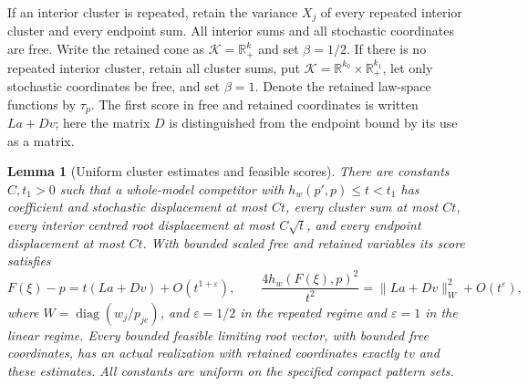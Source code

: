 \documentclass[11pt,reqno]{amsart}
\numberwithin{equation}{section}
\newtheorem{lemma}[theorem]{Lemma}
\theoremstyle{definition}
\theoremstyle{remark}
\newcommand{\R}{\mathbb R}
\newcommand{\cK}{\mathcal K}
\newcommand{\eps}{\varepsilon}
\begin{document}
If an interior cluster is repeated, retain the variance $X_j$ of every repeated interior cluster and every endpoint sum. All interior sums and all stochastic coordinates are free. Write the retained cone as $\cK=\R_+^k$ and set $\beta=1/2$. If there is no repeated interior cluster, retain all cluster sums, put $\cK=\R^{k_0}\times\R_+^{k_1}$, let only stochastic coordinates be free, and set $\beta=1$. Denote the retained law-space functions by $\tau_p$. The first score in free and retained coordinates is written $La+Dv$; here the matrix $D$ is distinguished from the endpoint bound by its use as a matrix.

\begin{lemma}[Uniform cluster estimates and feasible scores]\label{lem:clusters}
There are constants $C,t_1>0$ such that a whole-model competitor with $h_w(p',p)\le t<t_1$ has coefficient and stochastic displacement at most $Ct$, every cluster sum at most $Ct$, every interior centred root displacement at most $C\sqrt t$, and every endpoint displacement at most $Ct$. With bounded scaled free and retained variables its score satisfies
\begin{equation}\label{eq:score}
 F(\xi)-p=t(La+Dv)+O(t^{1+\eps}),\qquad
 \frac{4h_w(F(\xi),p)^2}{t^2}=\|La+Dv\|_W^2+O(t^\eps),
\end{equation}
where $W=\operatorname{diag}(w_j/p_{je})$, and $\eps=1/2$ in the repeated regime and $\eps=1$ in the linear regime. Every bounded feasible limiting root vector, with bounded free coordinates, has an actual realization with retained coordinates exactly $tv$ and these estimates. All constants are uniform on the specified compact pattern sets.
\end{lemma}
\end{document}
